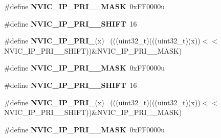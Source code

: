 \begin{DoxyCompactItemize}
\item 
\hypertarget{group___n_v_i_c___register___masks_gaae46d51a7882de8b512f0c0a8c659d40}{}\#define {\bfseries N\+V\+I\+C\+\_\+\+I\+P\+\_\+\+P\+R\+I\+\_\+\_\+\+M\+A\+S\+K}~0x\+F\+F0000u\label{group___n_v_i_c___register___masks_gaae46d51a7882de8b512f0c0a8c659d40}

\item 
\hypertarget{group___n_v_i_c___register___masks_gae17887a1fece9545657814829b6a8f91}{}\#define {\bfseries N\+V\+I\+C\+\_\+\+I\+P\+\_\+\+P\+R\+I\+\_\+\_\+\+S\+H\+I\+F\+T}~16\label{group___n_v_i_c___register___masks_gae17887a1fece9545657814829b6a8f91}

\item 
\hypertarget{group___n_v_i_c___register___masks_ga8294881daf3360b8f41923c8f2a8c897}{}\#define {\bfseries N\+V\+I\+C\+\_\+\+I\+P\+\_\+\+P\+R\+I\+\_}(x)                                            ~(((uint32\+\_\+t)(((uint32\+\_\+t)(x))$<$$<$N\+V\+I\+C\+\_\+\+I\+P\+\_\+\+P\+R\+I\+\_\+\_\+\+S\+H\+I\+F\+T))\&N\+V\+I\+C\+\_\+\+I\+P\+\_\+\+P\+R\+I\+\_\+\_\+\+M\+A\+S\+K)\label{group___n_v_i_c___register___masks_ga8294881daf3360b8f41923c8f2a8c897}

\item 
\hypertarget{group___n_v_i_c___register___masks_ga6be8bfca245e377fed6f71e809698c82}{}\#define {\bfseries N\+V\+I\+C\+\_\+\+I\+P\+\_\+\+P\+R\+I\+\_\+\_\+\+M\+A\+S\+K}~0x\+F\+F0000u\label{group___n_v_i_c___register___masks_ga6be8bfca245e377fed6f71e809698c82}

\item 
\hypertarget{group___n_v_i_c___register___masks_ga95bad88287c49846044bc97959a7d7a3}{}\#define {\bfseries N\+V\+I\+C\+\_\+\+I\+P\+\_\+\+P\+R\+I\+\_\+\_\+\+S\+H\+I\+F\+T}~16\label{group___n_v_i_c___register___masks_ga95bad88287c49846044bc97959a7d7a3}

\item 
\hypertarget{group___n_v_i_c___register___masks_gab9b2b3c5430d597e2e2f5495fb46943c}{}\#define {\bfseries N\+V\+I\+C\+\_\+\+I\+P\+\_\+\+P\+R\+I\+\_}(x)                                              ~(((uint32\+\_\+t)(((uint32\+\_\+t)(x))$<$$<$N\+V\+I\+C\+\_\+\+I\+P\+\_\+\+P\+R\+I\+\_\+\_\+\+S\+H\+I\+F\+T))\&N\+V\+I\+C\+\_\+\+I\+P\+\_\+\+P\+R\+I\+\_\+\_\+\+M\+A\+S\+K)\label{group___n_v_i_c___register___masks_gab9b2b3c5430d597e2e2f5495fb46943c}

\item 
\hypertarget{group___n_v_i_c___register___masks_ga713bbc46d505c895fc20c8b0ea74f8dd}{}\#define {\bfseries N\+V\+I\+C\+\_\+\+I\+P\+\_\+\+P\+R\+I\+\_\+\_\+\+M\+A\+S\+K}~0x\+F\+F0000u\label{group___n_v_i_c___register___masks_ga713bbc46d505c895fc20c8b0ea74f8dd}


\end{DoxyCompactItemize}
